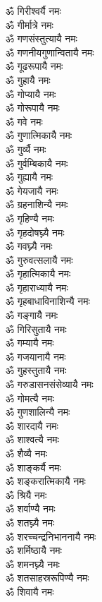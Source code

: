 \begin{flushleft}
\begin{multicols}{2}
ॐ गिरीश्वर्यै नमः\\
ॐ गीर्मात्रे नमः\\
ॐ गणसंस्तुत्यायै नमः\\
ॐ गणनीयगुणान्वितायै नमः\\
ॐ गूढरूपायै नमः\\
ॐ गुहायै नमः\\
ॐ गोप्यायै नमः\\
ॐ गोरूपायै नमः\hfill{}\\
ॐ गवे नमः\\
ॐ गुणात्मिकायै नमः\\
ॐ गुर्व्यै नमः\\
ॐ गुर्वम्बिकायै नमः\\
ॐ गुह्यायै नमः\\
ॐ गेयजायै नमः\\
ॐ ग्रहनाशिन्यै नमः\\
ॐ गृहिण्यै नमः\\
ॐ गृहदोषघ्न्यै नमः\\
ॐ गवघ्न्यै नमः\hfill{}\\
ॐ गुरुवत्सलायै नमः\\
ॐ गृहात्मिकायै नमः\\
ॐ गृहाराध्यायै नमः\\
ॐ गृहबाधाविनाशिन्यै नमः\\
ॐ गङ्गायै नमः\\
ॐ गिरिसुतायै नमः\\
ॐ गम्यायै नमः\\
ॐ गजयानायै नमः\\
ॐ गुहस्तुतायै नमः\\
ॐ गरुडासनसंसेव्यायै नमः\hfill{}\\
ॐ गोमत्यै नमः\\
ॐ गुणशालिन्यै नमः\\
ॐ शारदायै नमः\\
ॐ शाश्वत्यै नमः\\
ॐ शैव्यै नमः\\
ॐ शाङ्कर्यै नमः\\
ॐ शङ्करात्मिकायै नमः\\
ॐ श्रियै नमः\\
ॐ शर्वाण्यै नमः\\
ॐ शतघ्न्यै नमः\hfill{}\\
ॐ शरच्चन्द्रनिभाननायै नमः\\
ॐ शर्मिष्ठायै नमः\\
ॐ शमनघ्न्यै नमः\\
ॐ शतसाहस्ररूपिण्यै नमः\\
ॐ शिवायै नमः\\

\end{multicols}
\end{flushleft}
